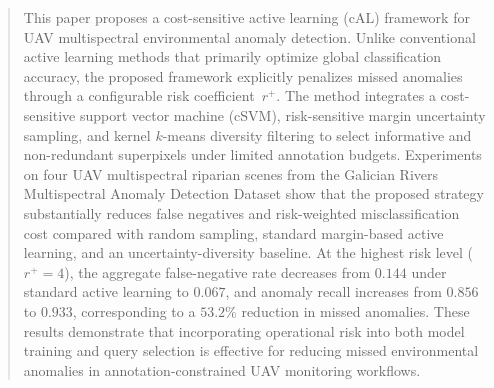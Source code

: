 %
%
%


\begin{abstract}
This paper proposes a cost-sensitive active learning (cAL) framework
for UAV multispectral environmental anomaly detection. Unlike
conventional active learning methods that primarily optimize global
classification accuracy, the proposed framework explicitly penalizes
missed anomalies through a configurable risk coefficient~$r^{+}$.
The method integrates a cost-sensitive support vector machine (cSVM),
risk-sensitive margin uncertainty sampling, and kernel $k$-means
diversity filtering to select informative and non-redundant
superpixels under limited annotation budgets. Experiments on four
UAV multispectral riparian scenes from the Galician Rivers
Multispectral Anomaly Detection Dataset show that the proposed
strategy substantially reduces false negatives and risk-weighted
misclassification cost compared with random sampling, standard
margin-based active learning, and an uncertainty-diversity baseline.
At the highest risk level ($r^{+}=4$), the aggregate false-negative
rate decreases from $0.144$ under standard active learning to
$0.067$, and anomaly recall increases from $0.856$ to $0.933$,
corresponding to a $53.2\%$ reduction in missed anomalies. These
results demonstrate that incorporating operational risk into both
model training and query selection is effective for reducing missed
environmental anomalies in annotation-constrained UAV monitoring
workflows.
\end{abstract}


